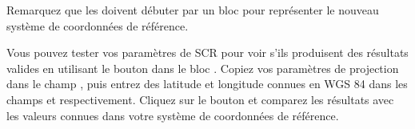 Remarquez que les  doivent débuter par un  bloc  pour représenter le nouveau système de coordonnées de référence.

Vous pouvez tester vos paramètres de SCR pour voir s'ils produisent des  résultats valides en utilisant le bouton  dans le bloc  . Copiez vos paramètres de projection dans le champ , puis entrez des latitude et longitude connues en WGS 84 dans les champs  et  respectivement. Cliquez sur le bouton  et comparez les résultats avec les valeurs connues dans votre système de coordonnées de référence.
